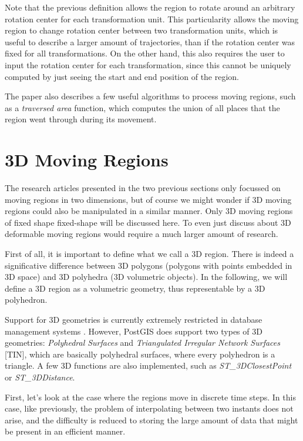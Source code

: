 Note that the previous definition allows the region to rotate around an arbitrary rotation center for each transformation unit. This particularity allows the moving region to change rotation center between two transformation units, which is useful to describe a larger amount of trajectories, than if the rotation center was fixed for all transformations. On the other hand, this also requires the user to input the rotation center for each transformation, since this cannot be uniquely computed by just seeing the start and end position of the region.

The paper  also describes a few useful algorithms to process moving regions, such as a \textit{traversed area} function, which computes the union of all places that the region went through during its movement.

\section{3D Moving Regions}

The research articles presented in the two previous sections only focussed on moving regions in two dimensions, but of course we might wonder if 3D moving regions could also be manipulated in a similar manner. Only 3D moving regions of fixed shape fixed-shape will be discussed here. To even just discuss about 3D deformable moving regions would require a much larger amount of research.

First of all, it is important to define what we call a 3D region. There is indeed a significative difference between 3D polygons (polygons with points embedded in 3D space) and 3D polyhedra (3D volumetric objects). In the following, we will define a 3D region as a volumetric geometry, thus representable by a 3D polyhedron.


Support for 3D geometries is currently extremely restricted in database management systems . However, PostGIS does support two types of 3D geometries: \textit{Polyhedral Surfaces} and \textit{Triangulated Irregular Network Surfaces} [TIN], which are basically polyhedral surfaces, where every polyhedron is a triangle. A few 3D functions are also implemented, such as \textit{ST\_3DClosestPoint} or \textit{ST\_3DDistance}.

First, let's look at the case where the regions move in discrete time steps. In this case, like previously, the problem of interpolating between two instants does not arise, and the difficulty is reduced to storing the large amount of data that might be present in an efficient manner. 

